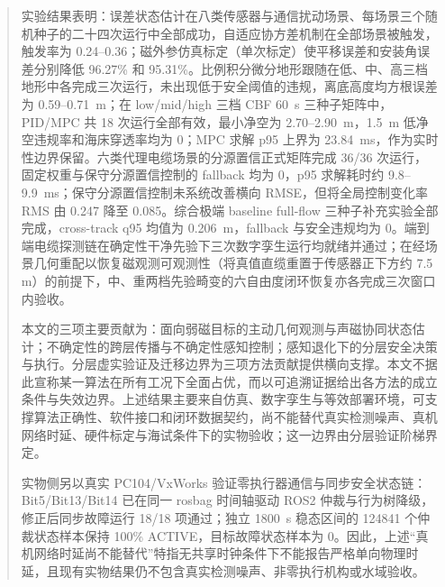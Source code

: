 \begin{abstract}
  实验结果表明：误差状态估计在八类传感器与通信扰动场景、每场景三个随机种子的二十四次运行中全部成功，自适应协方差机制在全部场景被触发，触发率为 0.24--0.36；磁外参仿真标定（单次标定）使平移误差和安装角误差分别降低 96.27\% 和 95.31\%。比例积分微分地形跟随在低、中、高三档地形中各完成三次运行，未出现低于安全阈值的违规，离底高度均方根误差为 0.59--0.71~m；在 low/mid/high 三档 CBF 60~s 三种子矩阵中，PID/MPC 共 18 次运行全部有效，最小净空为 2.70--2.90~m，1.5~m 低净空违规率和海床穿透率均为 0；MPC 求解 p95 上界为 23.84~ms，作为实时性边界保留。六类代理电缆场景的分源置信正式矩阵完成 36/36 次运行，固定权重与保守分源置信控制的 fallback 均为 0，p95 求解耗时约 9.8--9.9~ms；保守分源置信控制未系统改善横向 RMSE，但将全局控制变化率 RMS 由 0.247 降至 0.085。综合极端 baseline full-flow 三种子补充实验全部完成，cross-track q95 均值为 0.206~m，fallback 与安全违规均为 0。端到端电缆探测链在确定性干净先验下三次数字孪生运行均就绪并通过；在经场景几何重配以恢复磁观测可观测性（将真值直缆重置于传感器正下方约 7.5 m）的前提下，中、重两档先验畸变的六自由度闭环恢复亦各完成三次窗口内验收。

  本文的三项主要贡献为：面向弱磁目标的主动几何观测与声磁协同状态估计；不确定性的跨层传播与不确定性感知控制；感知退化下的分层安全决策与执行。分层虚实验证及迁移边界为三项方法贡献提供横向支撑。本文不据此宣称某一算法在所有工况下全面占优，而以可追溯证据给出各方法的成立条件与失效边界。上述结果主要来自仿真、数字孪生与等效部署环境，可支撑算法正确性、软件接口和闭环数据契约，尚不能替代真实检测噪声、真机网络时延、硬件标定与海试条件下的实物验收；这一边界由分层验证阶梯界定。

  实物侧另以真实 PC104/VxWorks 验证零执行器通信与同步安全状态链：Bit5/Bit13/Bit14 已在同一 rosbag 时间轴驱动 ROS2 仲裁与行为树降级，修正后同步故障运行 18/18 项通过；独立 1800~s 稳态区间的 124841 个仲裁状态样本保持 100\% ACTIVE，目标故障状态样本为 0。因此，上述``真机网络时延尚不能替代''特指无共享时钟条件下不能报告严格单向物理时延，且现有实物结果仍不包含真实检测噪声、非零执行机构或水域验收。

\end{abstract}

